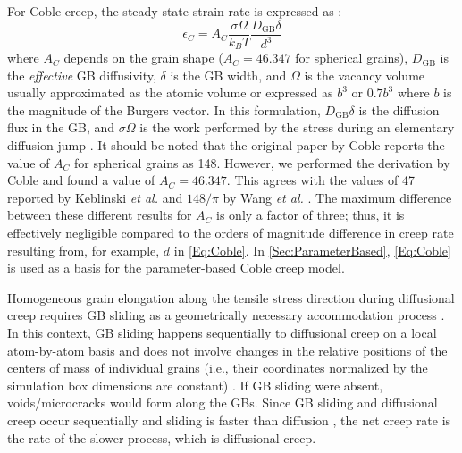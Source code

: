 \documentclass[preprint, 12pt]{elsarticle}
\newcommand{\?}{\stackrel{?}{=}}
\begin{document}

For Coble creep, the steady-state strain rate is expressed as \cite{Coble1963, Courtney2005}:
\begin{equation}
\Dot{\epsilon}_C = A_C \frac{\sigma \Omega}{k_B T} \frac{ D_{\mathrm{GB}} \delta }{d^3} 
\label{Eq:Coble}
\end{equation}
where $A_C$ depends on the grain shape ($A_C = 46.347$ for spherical grains), $D_{\mathrm{GB}}$ is the \textit{effective} GB diffusivity, $\delta$ is the GB width, and $\Omega$ is the vacancy volume usually approximated as the atomic volume or expressed as $b^3$ \cite{Mukherjee2002} or $0.7b^3$ \cite{Meyers2009} where $b$ is the magnitude of the Burgers vector. In this formulation, $D_{\mathrm{GB}} \delta$ is the diffusion flux in the GB, and $\sigma \Omega$ is the work performed by the stress during an elementary diffusion jump \cite{Keblinski1998, Yamakov2002}. It should be noted that the original paper by Coble \cite{Coble1963} reports the value of $A_C$ for spherical grains as 148. However, we performed the derivation by Coble and found a value of $A_C = 46.347$. This agrees with the values of 47 reported by Keblinski \textit{et al.} \cite{Keblinski1998} and $148/\pi$ by Wang \textit{et al.} \cite{Wang2011}. The maximum difference between these different results for $A_C$ is only a factor of three; thus, it is effectively negligible compared to the orders of magnitude difference in creep rate resulting from, for example, $d$ in \cref{Eq:Coble}. In \cref{Sec:ParameterBased}, \cref{Eq:Coble} is used as a basis for the parameter-based Coble creep model.

Homogeneous grain elongation along the tensile stress direction during diffusional creep requires GB sliding as a geometrically necessary accommodation process \cite{Yamakov2002, Courtney2005}. In this context, GB sliding happens sequentially to diffusional creep on a local atom-by-atom basis and does not involve changes in the relative positions of the centers of mass of individual grains (i.e., their coordinates normalized by the simulation box dimensions are constant) \cite{Courtney2005}. If GB sliding were absent, voids/microcracks would form along the GBs. Since GB sliding and diffusional creep occur sequentially and sliding is faster than diffusion \cite{Courtney2005}, the net creep rate is the rate of the slower process, which is diffusional creep.
\end{document}
